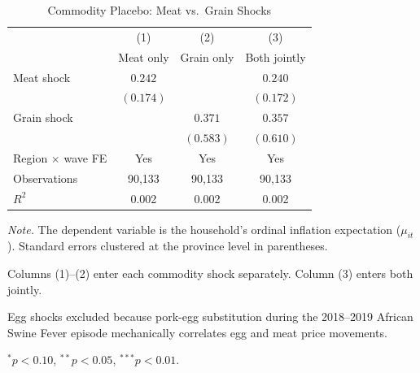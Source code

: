 \begin{table}[!htbp]
\centering
\caption{Commodity Placebo: Meat vs.\ Grain Shocks}
\label{tab:placebo_commodity}
\begin{threeparttable}
\begin{tabular}{lccc}
\toprule
& (1) & (2) & (3) \\
& Meat only & Grain only & Both jointly \\
\midrule
Meat shock & $0.242$ &  & $0.240$ \\
& $(0.174)$ &  & $(0.172)$ \\[4pt]
Grain shock &  & $0.371$ & $0.357$ \\
&  & $(0.583)$ & $(0.610)$ \\[4pt]
\midrule
Region $\times$ wave FE & Yes & Yes & Yes \\
Observations & 90,133 & 90,133 & 90,133 \\
$R^2$ & 0.002 & 0.002 & 0.002 \\
\bottomrule
\end{tabular}
\begin{tablenotes}[flushleft]
\footnotesize
\item \textit{Note.} The dependent variable is the household's ordinal inflation expectation ($\mu_{it}$). Standard errors clustered at the province level in parentheses.
\item Columns (1)--(2) enter each commodity shock separately. Column (3) enters both jointly.
\item Egg shocks excluded because pork-egg substitution during the 2018--2019 African Swine Fever episode mechanically correlates egg and meat price movements.
\item $^{*}p<0.10$, $^{**}p<0.05$, $^{***}p<0.01$.
\end{tablenotes}
\end{threeparttable}
\end{table}
